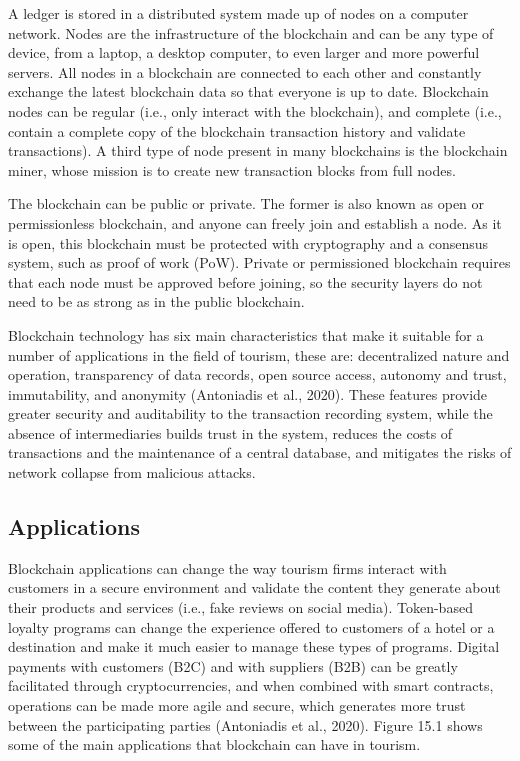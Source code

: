 \documentclass[
  letterpaper,
  DIV=11,
  numbers=noendperiod]{scrreprt}
\begin{document}
A ledger is stored in a distributed system made up of nodes on a
computer network. Nodes are the infrastructure of the blockchain and can
be any type of device, from a laptop, a desktop computer, to even larger
and more powerful servers. All nodes in a blockchain are connected to
each other and constantly exchange the latest blockchain data so that
everyone is up to date. Blockchain nodes can be regular (i.e., only
interact with the blockchain), and complete (i.e., contain a complete
copy of the blockchain transaction history and validate transactions). A
third type of node present in many blockchains is the blockchain miner,
whose mission is to create new transaction blocks from full nodes.

The blockchain can be public or private. The former is also known as
open or permissionless blockchain, and anyone can freely join and
establish a node. As it is open, this blockchain must be protected with
cryptography and a consensus system, such as proof of work (PoW).
Private or permissioned blockchain requires that each node must be
approved before joining, so the security layers do not need to be as
strong as in the public blockchain.

Blockchain technology has six main characteristics that make it suitable
for a number of applications in the field of tourism, these are:
decentralized nature and operation, transparency of data records, open
source access, autonomy and trust, immutability, and anonymity
(Antoniadis et al., 2020). These features provide greater security and
auditability to the transaction recording system, while the absence of
intermediaries builds trust in the system, reduces the costs of
transactions and the maintenance of a central database, and mitigates
the risks of network collapse from malicious attacks.

\hypertarget{applications-1}{%
\subsection{Applications}\label{applications-1}}

Blockchain applications can change the way tourism firms interact with
customers in a secure environment and validate the content they generate
about their products and services (i.e., fake reviews on social media).
Token-based loyalty programs can change the experience offered to
customers of a hotel or a destination and make it much easier to manage
these types of programs. Digital payments with customers (B2C) and with
suppliers (B2B) can be greatly facilitated through cryptocurrencies, and
when combined with smart contracts, operations can be made more agile
and secure, which generates more trust between the participating parties
(Antoniadis et al., 2020). Figure 15.1 shows some of the main
applications that blockchain can have in tourism.
\end{document}
